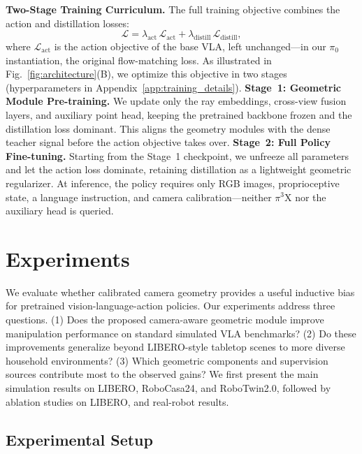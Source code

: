 \documentclass{article}
\begin{document}
\textbf{Two-Stage Training Curriculum.}
The full training objective combines the action and distillation losses:
\begin{equation}
    \mathcal{L}
    = \lambda_{\mathrm{act}}\,\mathcal{L}_{\mathrm{act}}
    + \lambda_{\mathrm{distill}}\,\mathcal{L}_{\mathrm{distill}},
\end{equation}
where $\mathcal{L}_{\mathrm{act}}$ is the action objective of the base VLA, left
unchanged---in our $\pi_0$ instantiation, the original flow-matching loss. As
illustrated in Fig.~\ref{fig:architecture}(B), we optimize this objective in two
stages (hyperparameters in Appendix~\ref{app:training_details}).
%
\textbf{Stage~1: Geometric Module Pre-training.}
We update only the ray embeddings, cross-view fusion layers, and auxiliary point
head, keeping the pretrained backbone frozen and the distillation loss dominant.
This aligns the geometry modules with the dense teacher signal before the action
objective takes over.
%
\textbf{Stage~2: Full Policy Fine-tuning.}
Starting from the Stage~1 checkpoint, we unfreeze all parameters and let the
action loss dominate, retaining distillation as a lightweight geometric
regularizer. At inference, the policy requires only RGB images, proprioceptive
state, a language instruction, and camera calibration---neither $\pi^3$X nor the
auxiliary head is queried.











\section{Experiments}
\label{sec:results}

We evaluate whether calibrated camera geometry provides a useful inductive bias for pretrained vision-language-action policies. Our experiments address three questions. (1) Does the proposed camera-aware geometric module improve manipulation performance on standard simulated VLA benchmarks? (2) Do these improvements generalize beyond LIBERO-style tabletop scenes to more diverse household environments? (3) Which geometric components and supervision sources contribute most to the observed gains? We first present the main simulation results on LIBERO, RoboCasa24, and RoboTwin2.0, followed by ablation studies on LIBERO, and real-robot results.
\subsection{Experimental Setup}
\label{sec:exp_setup}
\end{document}
